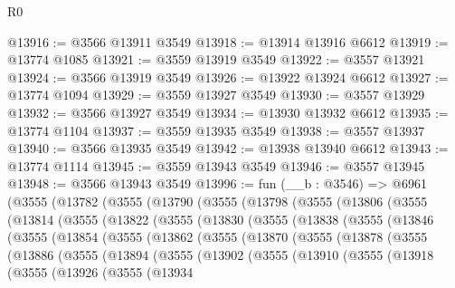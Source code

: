 \begin{lexlean}{R0}
\begin{coremodule}
@13916 := @3566 @13911 @3549
@13918 := @13914 @13916 @6612
@13919 := @13774 @1085
@13921 := @3559 @13919 @3549
@13922 := @3557 @13921
@13924 := @3566 @13919 @3549
@13926 := @13922 @13924 @6612
@13927 := @13774 @1094
@13929 := @3559 @13927 @3549
@13930 := @3557 @13929
@13932 := @3566 @13927 @3549
@13934 := @13930 @13932 @6612
@13935 := @13774 @1104
@13937 := @3559 @13935 @3549
@13938 := @3557 @13937
@13940 := @3566 @13935 @3549
@13942 := @13938 @13940 @6612
@13943 := @13774 @1114
@13945 := @3559 @13943 @3549
@13946 := @3557 @13945
@13948 := @3566 @13943 @3549
@13996 := fun (__b : @3546) =>
  @6961
    (@3555
      (@13782
        (@3555
          (@13790
            (@3555
              (@13798
                (@3555
                  (@13806
                    (@3555
                      (@13814
                        (@3555
                          (@13822
                            (@3555
                              (@13830
                                (@3555
                                  (@13838
                                    (@3555
                                      (@13846
                                        (@3555
                                          (@13854
                                            (@3555
                                              (@13862
                                                (@3555
                                                  (@13870
                                                    (@3555
                                                      (@13878
                                                        (@3555
                                                          (@13886
                                                            (@3555
                                                              (@13894
                                                                (@3555
                                                                  (@13902
                                                                    (@3555
                                                                      (@13910
                                                                        (@3555
                                                                          (@13918
                                                                            (@3555
                                                                              (@13926
                                                                                (@3555
                                                                                  (@13934

\end{coremodule}
\end{lexlean}
